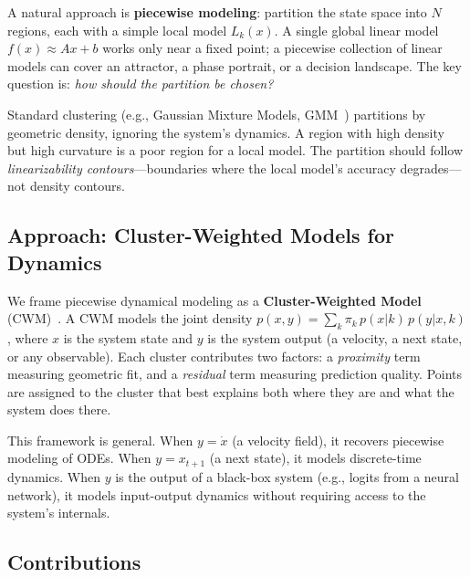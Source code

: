 \documentclass[11pt]{article}
\theoremstyle{definition}
\begin{document}
A natural approach is \textbf{piecewise modeling}: partition the state space into $N$ regions, each with a simple local model $L_k(x)$. A single global linear model $f(x)\approx Ax+b$ works only near a fixed point; a piecewise collection of linear models can cover an attractor, a phase portrait, or a decision landscape. The key question is: \emph{how should the partition be chosen?}

Standard clustering (e.g., Gaussian Mixture Models, GMM~\cite{mclachlan2000gmm}) partitions by geometric density, ignoring the system's dynamics. A region with high density but high curvature is a poor region for a local model. The partition should follow \emph{linearizability contours}---boundaries where the local model's accuracy degrades---not density contours.

\subsection{Approach: Cluster-Weighted Models for Dynamics}

We frame piecewise dynamical modeling as a \textbf{Cluster-Weighted Model} (CWM)~\cite{gershenfeld1997,ingrassia2012,ingrassia2014}. A CWM models the joint density $p(x,y)=\sum_k\pi_k\,p(x|k)\,p(y|x,k)$, where $x$ is the system state and $y$ is the system output (a velocity, a next state, or any observable). Each cluster contributes two factors: a \emph{proximity} term measuring geometric fit, and a \emph{residual} term measuring prediction quality. Points are assigned to the cluster that best explains both where they are and what the system does there.

This framework is general. When $y=\dot{x}$ (a velocity field), it recovers piecewise modeling of ODEs. When $y=x_{t+1}$ (a next state), it models discrete-time dynamics. When $y$ is the output of a black-box system (e.g., logits from a neural network), it models input-output dynamics without requiring access to the system's internals.

\subsection{Contributions}
\end{document}
